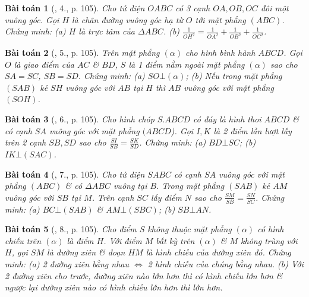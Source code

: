 \documentclass{article}
\numberwithin{equation}{section}
\newtheorem{baitoan}{Bài toán}
\begin{document}
\begin{baitoan}[\cite{SGK_Toan_11_hinh_hoc_co_ban}, 4., p. 105]
	Cho tứ diện $OABC$ có 3 cạnh $OA,OB,OC$ đôi một vuông góc. Gọi $H$ là chân đường vuông góc hạ từ $O$ tới mặt phẳng $(ABC)$. Chứng minh: (a) $H$ là trực tâm của $\Delta ABC$. (b) $\frac{1}{OH^2} = \frac{1}{OA^2} + \frac{1}{OB^2} + \frac{1}{OC^2}$. 
\end{baitoan}

\begin{baitoan}[\cite{SGK_Toan_11_hinh_hoc_co_ban}, 5., p. 105]
	Trên mặt phẳng $(\alpha)$ cho hình bình hành $ABCD$. Gọi $O$ là giao điểm của $AC$ \& $BD$, $S$ là 1 điểm nằm ngoài mặt phẳng $(\alpha)$ sao cho $SA = SC$, $SB = SD$. Chứng minh: (a) $SO\bot(\alpha)$; (b) Nếu trong mặt phẳng $(SAB)$ kẻ $SH$ vuông góc với $AB$ tại $H$ thì $AB$ vuông góc với mặt phẳng $(SOH)$.
\end{baitoan}

\begin{baitoan}[\cite{SGK_Toan_11_hinh_hoc_co_ban}, 6., p. 105]
	Cho hình chóp $S.ABCD$ có đáy là hình thoi $ABCD$ \& có cạnh $SA$ vuông góc với mặt phẳng $(ABCD$). Gọi $I,K$ là 2 điểm lần lượt lấy trên 2 cạnh $SB,SD$ sao cho $\frac{SI}{SB} = \frac{SK}{SD}$. Chứng minh: (a) $BD\bot SC$; (b) $IK\bot(SAC)$.
\end{baitoan}

\begin{baitoan}[\cite{SGK_Toan_11_hinh_hoc_co_ban}, 7., p. 105]
	Cho tứ diện $SABC$ có cạnh $SA$ vuông góc với mặt phẳng $(ABC)$ \& có $\Delta ABC$ vuông tại $B$. Trong mặt phẳng $(SAB)$ kẻ $AM$ vuông góc với $SB$ tại $M$. Trên cạnh $SC$ lấy điểm $N$ sao cho $\frac{SM}{SB} = \frac{SN}{SC}$. Chứng minh: (a) $BC\bot(SAB)$ \& $AM\bot(SBC)$; (b) $SB\bot AN$.
\end{baitoan}

\begin{baitoan}[\cite{SGK_Toan_11_hinh_hoc_co_ban}, 8., p. 105]
	Cho điểm $S$ không thuộc mặt phẳng $(\alpha)$ có hình chiếu trên $(\alpha)$ là điểm $H$. Với điểm $M$ bất kỳ trên $(\alpha)$ \& $M$ không trùng với $H$, gọi $SM$ là đường xiên \& đoạn $HM$ là hình chiếu của đường xiên đó. Chứng minh: (a) 2 đường xiên bằng nhau $\Leftrightarrow$ 2 hình chiếu của chúng bằng nhau. (b) Với 2 đường xiên cho trước, đường xiên nào lớn hơn thì có hình chiếu lớn hơn \& ngược lại đường xiên nào có hình chiếu lớn hơn thì lớn hơn.
\end{baitoan}

\end{document}
